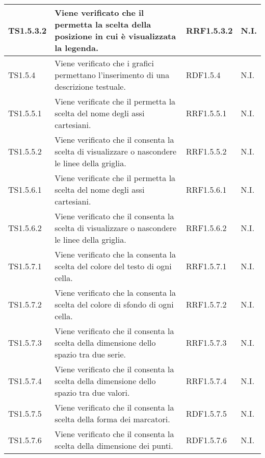 \begin{longtabu}{| X[0.5] | X | X[0.5] | X[0.4] |}
TS1.5.3.2 & Viene verificato che il  permetta la scelta della posizione in cui è visualizzata la legenda. & RRF1.5.3.2 & N.I.\\ \hline

TS1.5.4 & Viene verificato che i grafici permettano l'inserimento di una descrizione testuale. & RDF1.5.4 & N.I.\\ \hline

TS1.5.5.1 & Viene verificate che il  permetta la scelta del nome degli assi cartesiani. & RRF1.5.5.1 & N.I.\\ \hline

TS1.5.5.2 & Viene verificato che il  consenta la scelta di visualizzare o nascondere le linee della griglia.& RRF1.5.5.2 & N.I.\\ \hline

TS1.5.6.1 & Viene verificate che il  permetta la scelta del nome degli assi cartesiani. & RRF1.5.6.1 & N.I.\\ \hline

TS1.5.6.2 &	Viene verificato che il  consenta la scelta di visualizzare o nascondere le linee della griglia. & RRF1.5.6.2 & N.I.\\ \hline

TS1.5.7.1 & Viene verificato che la  consenta la scelta del colore del testo di ogni cella. & RRF1.5.7.1 & N.I.\\ \hline

TS1.5.7.2 & Viene verificato che la  consenta la scelta del colore di sfondo di ogni cella. & RRF1.5.7.2 & N.I.\\ \hline

TS1.5.7.3 & Viene verificato che il  consenta la scelta della dimensione dello spazio tra due serie. & RRF1.5.7.3 & N.I.\\ \hline

TS1.5.7.4 & Viene verificato che il  consenta la scelta della dimensione dello spazio tra due valori. & RRF1.5.7.4 & N.I.\\ \hline

TS1.5.7.5 & Viene verificato che il  consenta la scelta della forma dei marcatori. & RDF1.5.7.5 & N.I.\\ \hline

TS1.5.7.6 & Viene verificato che il  consenta la scelta della dimensione dei punti.&
RDF1.5.7.6 & N.I.\\ \hline


\end{longtabu}
